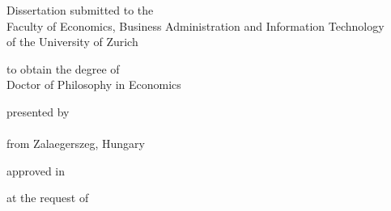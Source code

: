 \makeatletter
    \let\inserttitle\@title
    \let\insertauthor\@author
    \let\insertdate\@date
    \let\insertchairman\@chairman
    \let\insertcommittee\@committee
\makeatother

\begin{titlepage}
    \begin{doublespace}
    \begin{center}
        \vspace*{3cm}

        \begin{LARGE}
            \textbf{\inserttitle}
        \end{LARGE}

        \vfill

        \begin{large}
            Dissertation submitted to the\\Faculty of Economics, Business Administration and Information Technology\\of the University of Zurich
        \end{large}
 
        \vfill

        \begin{large}
            to obtain the degree of\\
            Doctor of Philosophy in Economics
        \end{large}

        \vfill

        \begin{large}
            presented by\\
            \textbf{\insertauthor}\\
            from Zalaegerszeg, Hungary
        \end{large}

        \vfill

        \begin{large}
            approved in \monthyeardate\insertdate
        \end{large}

        \vfill

        \begin{large}
            at the request of\\\insertcommittee
        \end{large}

    \vspace*{1cm}

    \end{center}
    \end{doublespace}
\end{titlepage}